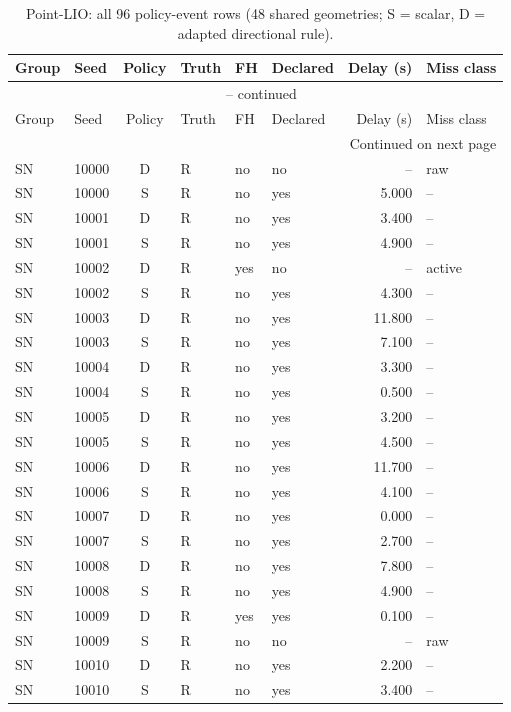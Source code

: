 \begingroup\footnotesize
\begin{longtable}{@{}llclllrl@{}}
\caption{Point-LIO: all 96 policy-event rows (48 shared geometries; S = scalar, D = adapted directional rule).}\\
\toprule
Group & Seed & Policy & Truth & FH & Declared & Delay (s) & Miss class\\\midrule\endfirsthead
\multicolumn{8}{c}{\tablename\ \thetable{} -- continued}\\
\toprule
Group & Seed & Policy & Truth & FH & Declared & Delay (s) & Miss class\\\midrule\endhead
\midrule\multicolumn{8}{r}{Continued on next page}\\\endfoot
\bottomrule\endlastfoot
SN & 10000 & D & R & no & no & -- & raw\\
SN & 10000 & S & R & no & yes & 5.000 & --\\
SN & 10001 & D & R & no & yes & 3.400 & --\\
SN & 10001 & S & R & no & yes & 4.900 & --\\
SN & 10002 & D & R & yes & no & -- & active\\
SN & 10002 & S & R & no & yes & 4.300 & --\\
SN & 10003 & D & R & no & yes & 11.800 & --\\
SN & 10003 & S & R & no & yes & 7.100 & --\\
SN & 10004 & D & R & no & yes & 3.300 & --\\
SN & 10004 & S & R & no & yes & 0.500 & --\\
SN & 10005 & D & R & no & yes & 3.200 & --\\
SN & 10005 & S & R & no & yes & 4.500 & --\\
SN & 10006 & D & R & no & yes & 11.700 & --\\
SN & 10006 & S & R & no & yes & 4.100 & --\\
SN & 10007 & D & R & no & yes & 0.000 & --\\
SN & 10007 & S & R & no & yes & 2.700 & --\\
SN & 10008 & D & R & no & yes & 7.800 & --\\
SN & 10008 & S & R & no & yes & 4.900 & --\\
SN & 10009 & D & R & yes & yes & 0.100 & --\\
SN & 10009 & S & R & no & no & -- & raw\\
SN & 10010 & D & R & no & yes & 2.200 & --\\
SN & 10010 & S & R & no & yes & 3.400 & --\\

\end{longtable}
